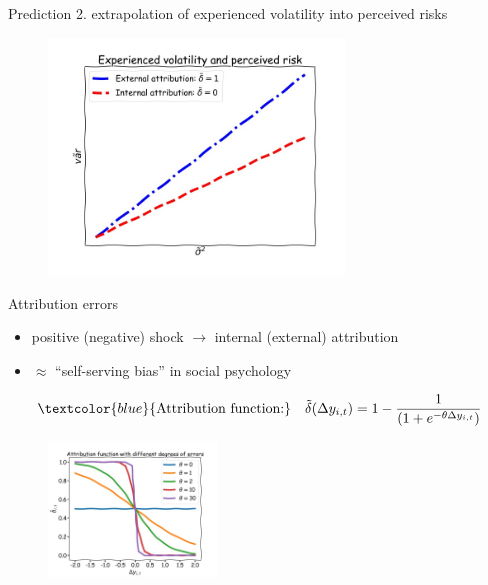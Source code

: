 \documentclass{beamer}
\begin{document}
\begin{frame}{Prediction 2. extrapolation of experienced volatility into perceived risks}
	\begin{figure}
		\centering 
		\label{var_experience_var}
		\includegraphics[width=0.7\textwidth]{figures/var_experience_var.jpg}
	\end{figure}
\end{frame}



\begin{frame}{Attribution errors}
	\begin{itemize}
		\item positive (negative) shock $\rightarrow$ internal (external) attribution
		\item $\approx$ ``self-serving bias'' in social psychology
	\end{itemize}
	\begin{eqnarray}
\begin{split}
\textcolor{blue}{\text{Attribution function:}} \quad \tilde \delta(\Delta y_{i,t}) = 1- \frac{1}{(1+e^{-\theta \Delta y_{i,t}})}
\end{split}
\end{eqnarray}
	
	\begin{figure}
		\centering 
		\label{var_experience_var}
		\includegraphics[width=0.4\textwidth]{figures/theta_corr.jpg}
	\end{figure}
\end{frame}
\end{document}
